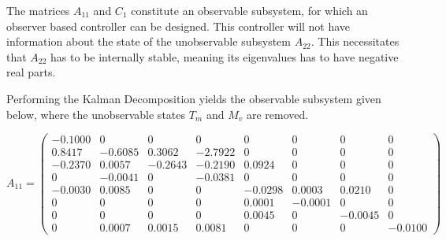 The matrices $A_{11}$ and $C_{1}$ constitute an observable subsystem, for which an observer based controller can be designed. This controller will not have information about the state of the unobservable subsystem $A_{22}$. This necessitates that $A_{22}$ has to be internally stable, meaning its eigenvalues has to have negative real parts.

Performing the Kalman Decomposition yields the observable subsystem given below, where the unobservable states $ T_m $ and $ M_v $ are removed.

\begin{equation}  \label{eq:A11}
	A_{11} = \left(\begin{array}{cccccccc}
		-0.1000 &        0 &        0 &        0 &        0 &        0 &        0 &        0  \\
		0.8417 &  -0.6085 &   0.3062 &  -2.7922 &        0 &        0 &        0 &        0  \\
		-0.2370 &   0.0057 &  -0.2643 &  -0.2190 &   0.0924 &        0 &        0 &        0  \\
		0 &  -0.0041 &        0 &  -0.0381 &        0 &        0 &        0 &        0  \\
		-0.0030 &   0.0085 &        0 &        0 &  -0.0298 &   0.0003 &   0.0210 &        0  \\
		0 &        0 &        0 &        0 &   0.0001 &  -0.0001 &        0 &        0  \\
		0 &        0 &        0 &        0 &   0.0045 &        0 &  -0.0045 &        0  \\
		0 &   0.0007 &   0.0015 &   0.0081 &        0 &        0 &        0 &  -0.0100
	\end{array}\right)
\end{equation}

\bigskip


